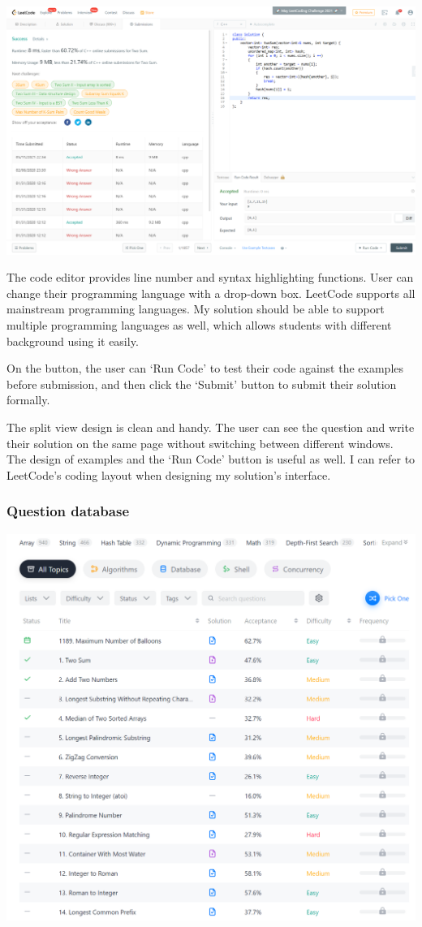 \documentclass[a4paper]{report}
\begin{document}
\includegraphics[width=\linewidth]{Two-Sum-LeetCode-Submission}

The code editor provides line number and syntax highlighting functions. User can change their programming language with a drop-down box. LeetCode supports all mainstream programming languages. My solution should be able to support multiple programming languages as well, which allows students with different background using it easily.

On the button, the user can `Run Code' to test their code against the examples before submission, and then click the `Submit' button to submit their solution formally.

The split view design is clean and handy. The user can see the question and write their solution on the same page without switching between different windows. The design of examples and the `Run Code' button is useful as well. I can refer to LeetCode's coding layout when designing my solution's interface.

\subsubsection{Question database}

\includegraphics[width=\linewidth]{LeetCode-Problems}
\end{document}
